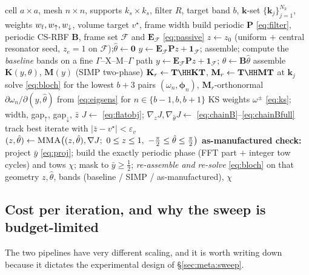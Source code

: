 \documentclass[11pt]{article}
\begin{document}
\begin{algorithm}[H]
\caption{Flat-band $+$ band-gap co-design on the periodic cell (Chain B)}
\label{alg:flat}
\begin{algorithmic}[1]
\Require cell $a\times a$, mesh $n\times n$, supports $k_s\times k_s$, filter $R$,
  target band $b$, $\mathbf k$-set $\{\mathbf k_j\}_{j=1}^{N_k}$, weights
  $w_{\rm f},w_\uparrow,w_\downarrow$, volume target $v^\star$, frame width
\State build periodic $\mathbf P$ \eqref{eq:filter}, periodic CS-RBF $\mathbf B$,
  frame set $\mathcal F$ and $\mathbf E_{\mathcal F}$ \eqref{eq:passive}
\State $z\gets z_0$ (uniform $+$ central resonator seed, $z_e=1$ on
  $\mathcal F$);\quad $\hat\theta\gets\mathbf 0$
\State $y\gets\mathbf E_{\mathcal F}\mathbf Pz+\mathbf 1_{\mathcal F}$;
  assemble; compute the \emph{baseline} bands on a fine $\Gamma$--X--M--$\Gamma$ path
  \State $y\gets\mathbf E_{\mathcal F}\mathbf Pz+\mathbf 1_{\mathcal F}$;\quad
         $\theta\gets\mathbf B\hat\theta$
  \State assemble $\mathbf K(y,\theta)$, $\mathbf M(y)$ (SIMP two-phase)
   
    \State $\mathbf K_r\gets\mathbf T\HH\mathbf K\mathbf T$,
           $\mathbf M_r\gets\mathbf T\HH\mathbf M\mathbf T$ at $\mathbf k_j$
    \State solve \eqref{eq:bloch} for the lowest $b+3$ pairs
           $(\omega_n,\bm\phi_n)$, $\mathbf M_r$-orthonormal
    \State $\partial\omega_n/\partial(y,\hat\theta)$ from \eqref{eq:eigsens}
           for $n\in\{b-1,b,b+1\}$
  \EndFor
  \State KS weights $\omega^\pm$ \eqref{eq:ks};\quad
         width, gap$_\uparrow$, gap$_\downarrow$, $\bar z$
  \State $J\gets$ \eqref{eq:flatobj};\quad
         $\nabla_zJ,\nabla_{\hat\theta}J\gets$
         \eqref{eq:chainB}--\eqref{eq:chainBfull}
  \State track best iterate with $|\bar z-v^\star|<\varepsilon_v$
  \State $(z,\hat\theta)\gets\textsc{MMA}\bigl((z,\hat\theta),\nabla J;\
         0\le z\le1,\ -\tfrac\pi2\le\hat\theta\le\tfrac\pi2\bigr)$
\EndFor
\State \textbf{as-manufactured check:} project $\bar y$ \eqref{eq:proj}; build the
  exactly periodic phase (FFT part $+$ integer tow cycles) and tows $\chi$; mask to
  $\bar y\ge\tfrac12$; \emph{re-assemble and re-solve} \eqref{eq:bloch} on that geometry
\State \Return $z,\hat\theta$, bands (baseline / SIMP / as-manufactured), $\chi$
\end{algorithmic}
\end{algorithm}

\subsection{Cost per iteration, and why the sweep is budget-limited}
\label{sec:algo:cost}
The two pipelines have very different scaling, and it is worth writing down
because it dictates the experimental design of \S\ref{sec:meta:sweep}.
\end{document}
